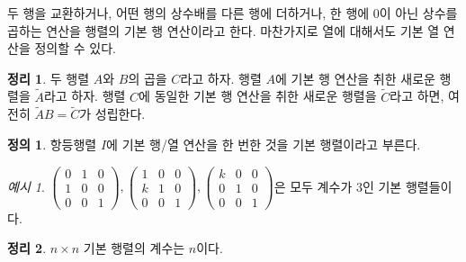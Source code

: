 \documentclass[unfonts,oneside,a4paper]{oblivoir}
\theoremstyle{definition}
\newtheorem{definition}{정의}
\theoremstyle{theorem}
\newtheorem{theorem}{정리}
\theoremstyle{remark}
\theoremstyle{remark}
\theoremstyle{remark}
\newtheorem*{example}{예시}
\theoremstyle{remark}
\begin{document}
두 행을 교환하거나, 어떤 행의 상수배를 다른 행에 더하거나, 한 행에 0이 아닌 상수를 곱하는 연산을 행렬의 기본 행 연산이라고 한다.
마찬가지로 열에 대해서도 기본 열 연산을 정의할 수 있다.

\begin{theorem} \label{thm:elementary_op}
    두 행렬 $A$와 $B$의 곱을 $C$라고 하자.
    행렬 $A$에 기본 행 연산을 취한 새로운 행렬을 $\tilde A$라고 하자.
    행렬 $C$에 동일한 기본 행 연산을 취한 새로운 행렬을 $\tilde C$라고 하면, 여전히 $\tilde A B = \tilde C$가 성립한다.
\end{theorem}

\begin{definition}
    항등행렬 $I$에 기본 행/열 연산을 한 번한 것을 기본 행렬이라고 부른다.
\end{definition}

\begin{example}
    $\begin{pmatrix}
        0 & 1 & 0\\
        1 & 0 & 0\\
        0 & 0 & 1
        \end{pmatrix}, \begin{pmatrix}
        1 & 0 & 0\\
        k & 1 & 0\\
        0 & 0 & 1
        \end{pmatrix}, \begin{pmatrix}
        k & 0 & 0\\
        0 & 1 & 0\\
        0 & 0 & 1
    \end{pmatrix}$은 모두 계수가 3인 기본 행렬들이다.
\end{example}

\begin{theorem} \label{thm:rank_elementary}
    $n \times n$ 기본 행렬의 계수는 $n$이다.
\end{theorem}
\end{document}
